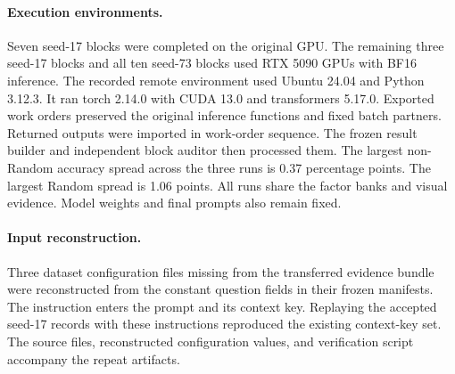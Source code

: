 \documentclass[10pt,twocolumn,letterpaper]{article}
\begin{document}
\paragraph{Execution environments.}
Seven seed-17 blocks were completed on the original GPU. The remaining three seed-17 blocks and all ten seed-73 blocks used RTX 5090 GPUs with BF16 inference. The recorded remote environment used Ubuntu 24.04 and Python 3.12.3. It ran torch 2.14.0 with CUDA 13.0 and transformers 5.17.0. Exported work orders preserved the original inference functions and fixed batch partners. Returned outputs were imported in work-order sequence. The frozen result builder and independent block auditor then processed them. The largest non-Random accuracy spread across the three runs is 0.37 percentage points. The largest Random spread is 1.06 points. All runs share the factor banks and visual evidence. Model weights and final prompts also remain fixed.

\paragraph{Input reconstruction.}
Three dataset configuration files missing from the transferred evidence bundle were reconstructed from the constant question fields in their frozen manifests. The instruction enters the prompt and its context key. Replaying the accepted seed-17 records with these instructions reproduced the existing context-key set. The source files, reconstructed configuration values, and verification script accompany the repeat artifacts.
\end{document}
